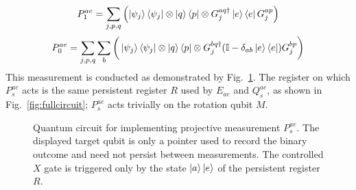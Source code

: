 \begin{equation}
    P^{ae}_1 = \sum_{j,p,q} \left( \ket{\psi_j}\bra{\psi_j} \otimes \ket{q}\bra{p} \otimes G_j^{aq\dagger}\ket{e}\bra{e}G_j^{ap} \right)
\end{equation}
\begin{equation}
    P^{ae}_0 = \sum_{j,p,q} \sum_{b}\bigg( \ket{\psi_j}\bra{\psi_j} \otimes \ket{q}\bra{p} \otimes G_j^{bq\dagger}(\mathbb{I} - \delta_{ab}\ket{e}\bra{e})G_j^{bp}  \bigg)
\end{equation}
This measurement is conducted as demonstrated by Fig.~\ref{fig:Pcircuit}. The register on which $P_s^{ae}$ acts is the same persistent register $R$ used by $E_{ae}$ and $Q_s^{ae}$, as shown in Fig.~\ref{fig:fullcircuit}; $P_s^{ae}$ acts trivially on the rotation qubit $M$.
\begin{figure}[htbp]
    \centering
{}

\caption{Quantum circuit for implementing projective measurement $P_s^{ae}$. The displayed target qubit is only a pointer used to record the binary outcome and need not persist between measurements. The controlled $X$ gate is triggered only by the state $\ket{a}\ket{e}$ of the persistent register $R$.}
\label{fig:Pcircuit}
\end{figure}
